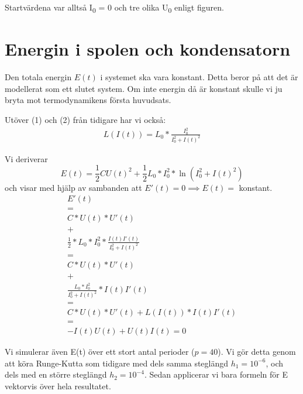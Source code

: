 \documentclass[a4paper, titlepage, 11pt]{article}
\begin{document}
Startvärdena var alltså I\textsubscript{0} = 0 och tre olika U\textsubscript{0} enligt figuren.


\section{Energin i spolen och kondensatorn}
Den totala energin $E(t)$ i systemet ska vara konstant. Detta beror på att det är modellerat som ett slutet system. Om inte energin då är konstant skulle vi ju bryta mot termodynamikens första huvudsats.

Utöver (1) och (2) från tidigare har vi också:
\begin{gather}
    L(I(t)) = L_0 * \frac{I_0^2}{I_0^2 + I(t)^2}
\end{gather}

Vi deriverar
$$E(t) = \frac{1}{2}CU(t)^2 + \frac{1}{2}L_0*I_0^2*\ln(I_0^2 + I(t)^2)$$
och visar med hjälp av sambanden att $E'(t) = 0 \implies E(t) =$ konstant.
\begin{gather*}
    E'(t) \\ = \\
    C*U(t)*U'(t) \\
    + \\
    \frac{1}{2}*L_0*I_0^2 * \frac{I(t)I'(t)}{I_0^2 + I(t)^2} \\
    = \\
    C*U(t)*U'(t) \\
    + \\
    \frac{L_0*I_0^2}{I_0^2 + I(t)^2}*I(t)I'(t) \\
    = \\
    C*U(t)*U'(t) + L(I(t)) * I(t)I'(t) \\
    = \\
    -I(t)U(t) + U(t)I(t) = 0
\end{gather*}

Vi simulerar även E(t) över ett stort antal perioder ($p = 40$). Vi gör detta genom att köra Runge-Kutta som tidigare med dels samma steglängd $h_1 = 10^{-6}$, och dels med en större steglängd $h_2 = 10^{-4}$. Sedan applicerar vi bara formeln för E vektorvis över hela resultatet.
\end{document}
